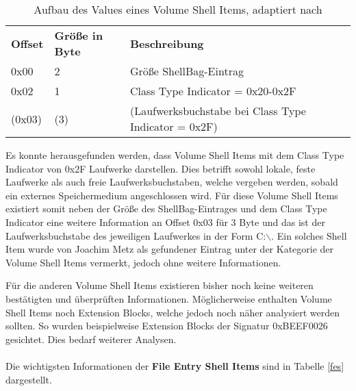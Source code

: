 \begin{longtable}{|p{}|p{}|p{}|}
	\caption{Aufbau des Values eines Volume Shell Items, adaptiert nach \cite{shelltype}} \label{volume} \vspace{1em} \\
	\hline
	\cellcolor{gray!25}\textbf{Offset} & \cellcolor{gray!25}\textbf{Größe in Byte} & \cellcolor{gray!25}\textbf{Beschreibung} \\
	\hline
	0x00 & 2 & Größe ShellBag-Eintrag\\
	\hline
	0x02 & 1 & Class Type Indicator = 0x20-0x2F \\
	\hline
	(0x03) & (3) & (Laufwerksbuchstabe bei Class Type Indicator = 0x2F) \\
	\hline
\end{longtable}
\vspace{1em}
Es konnte herausgefunden werden, dass Volume Shell Items mit dem Class Type Indicator von 0x2F Laufwerke darstellen. Dies betrifft sowohl lokale, feste Laufwerke als auch freie Laufwerksbuchstaben, welche vergeben werden, sobald ein externes Speichermedium angeschlossen wird. Für diese Volume Shell Items existiert somit neben der Größe des ShellBag-Eintrages und dem Class Type Indicator eine weitere Information an Offset 0x03 für 3 Byte und das ist der Laufwerksbuchstabe des jeweiligen Laufwerkes in der Form \glqq C:$\backslash$\grqq{}. Ein solches Shell Item wurde von Joachim Metz als gefundener Eintrag unter der Kategorie der Volume Shell Items vermerkt, jedoch ohne weitere Informationen. \cite{shelltype}

Für die anderen Volume Shell Items existieren bisher noch keine weiteren bestätigten und überprüften Informationen. Möglicherweise enthalten Volume Shell Items noch Extension Blocks, welche jedoch noch näher analysiert werden sollten. So wurden beispielweise Extension Blocks der Signatur 0xBEEF0026 gesichtet. Dies bedarf weiterer Analysen. \\
\\

Die wichtigsten Informationen der \textbf{File Entry Shell Items} sind in Tabelle \ref{fes} dargestellt.

